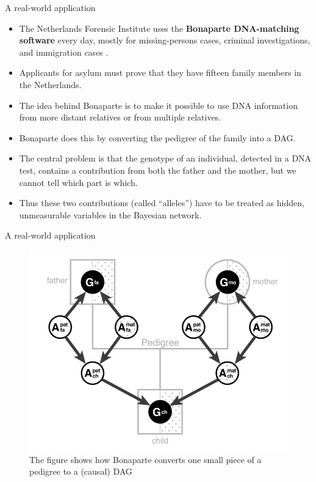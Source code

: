 \documentclass[handout]{beamer}
\begin{document}
\begin{frame}{A real-world application}
\scriptsize{
\begin{itemize}
\item  The Netherlands Forensic Institute uses the  \textbf{Bonaparte DNA-matching software}  every day, mostly for missing-persons cases, criminal investigations, and immigration cases \cite{pearl2018book}. 


\item Applicants for asylum must prove that they have fifteen family members in the Netherlands.

 \item The idea behind Bonaparte is to make it possible to use DNA information from more distant relatives or from multiple relatives.

  
\item Bonaparte does this by converting the pedigree of the family  into a DAG.

\item The central problem is that the genotype of an individual, detected in a DNA test, contains a contribution from both the father and the mother, but we cannot tell which part is which.


\item Thus these two contributions (called ``alleles'') have to be treated as hidden, unmeasurable variables in the Bayesian network.




 
\end{itemize}



} 

\end{frame}


\begin{frame}{A real-world application}

\begin{figure}[h!]
	\centering
	\includegraphics[scale=0.3]{pics/bonaparte.png}
	\caption{The figure shows  how Bonaparte converts one small piece of a pedigree to a (causal) DAG \cite{pearl2018book}}
	\end{figure} 


\end{frame}
\end{document}
